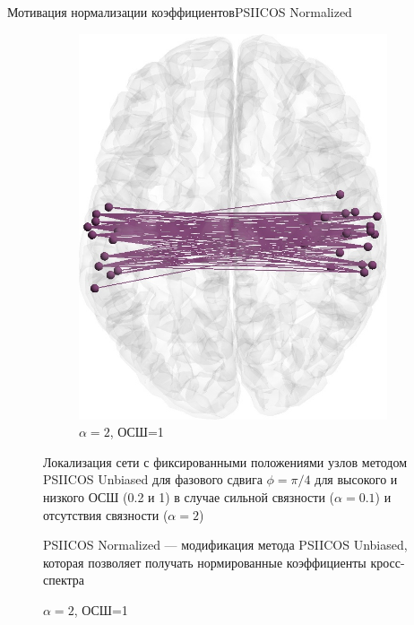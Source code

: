 \documentclass[12pt]{beamer}
\begin{document}
\begin{frame}[t]{Мотивация нормализации коэффициентов}{PSIICOS Normalized}
\begin{figure}[htbp]
\begin{subfigure}[t]{0.235\textwidth}
            \includegraphics[width=0.99\linewidth]{../images/loreta_brain_jitter_2_snr_1_phase_lag_07854.jpg}
            \caption{\tiny $\alpha=2$, ОСШ=1}\label{fig:unbiased_1_ntw_d}
        \end{subfigure}

        {\tiny\centering Локализация сети с фиксированными положениями узлов методом PSIICOS Unbiased для 
        фазового сдвига $\phi=\pi/4$ для высокого и низкого ОСШ (0.2 и 1) в
        случае сильной связности ($\alpha=0.1$) и отсутствия связности ($\alpha=2$)}\label{fig:unbiased_breaks_in_high_snr}

        {\footnotesize PSIICOS Normalized --- модификация метода PSIICOS Unbiased, которая позволяет получать нормированные коэффициенты кросс-спектра}
    \end{figure}
\end{frame}
\end{document}
